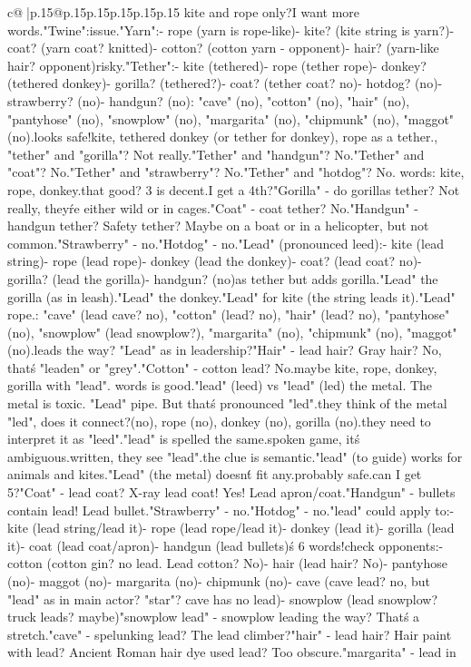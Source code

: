 \documentclass{article}
\begin{document}
{\begin{supertabular}{c@{$\;$}|p{.15\linewidth}@{}p{.15\linewidth}p{.15\linewidth}p{.15\linewidth}p{.15\linewidth}p{.15\linewidth}}
{{{kite and rope only?\nBut I want more words.\n\n"Twine":\nSame issue.\n\n"Yarn":\n- rope (yarn is rope-like)\n- kite? (kite string is yarn?)\n- coat? (yarn coat? knitted)\n- cotton? (cotton yarn - opponent)\n- hair? (yarn-like hair? opponent)\nToo risky.\n\n"Tether":\n- kite (tethered)\n- rope (tether rope)\n- donkey? (tethered donkey)\n- gorilla? (tethered?)\n- coat? (tether coat? no)\n- hotdog? (no)\n- strawberry? (no)\n- handgun? (no)\nOpponent: "cave" (no), "cotton" (no), "hair" (no), "pantyhose" (no), "snowplow" (no), "margarita" (no), "chipmunk" (no), "maggot" (no).\nThis looks safe!\nTethered kite, tethered donkey (or tether for donkey), rope as a tether.\nAlso, "tether" and "gorilla"? Not really.\n"Tether" and "handgun"? No.\n"Tether" and "coat"? No.\n"Tether" and "strawberry"? No.\n"Tether" and "hotdog"? No. words: kite, rope, donkey.\nIs that good? 3 is decent.\nCan I get a 4th?\n"Gorilla" - do gorillas tether? Not really, they\'re either wild or in cages.\n"Coat" - coat tether? No.\n"Handgun" - handgun tether? Safety tether? Maybe on a boat or in a helicopter, but not common.\n"Strawberry" - no.\n"Hotdog" - no.\n\n"Lead" (pronounced leed):\n- kite (lead string)\n- rope (lead rope)\n- donkey (lead the donkey)\n- coat? (lead coat? no)\n- gorilla? (lead the gorilla)\n- handgun? (no)\nSame as tether but adds gorilla.\n"Lead" the gorilla (as in leash).\n"Lead" the donkey.\n"Lead" for kite (the string leads it).\n"Lead" rope.\nOpponent: "cave" (lead cave? no), "cotton" (lead? no), "hair" (lead? no), "pantyhose" (no), "snowplow" (lead snowplow?), "margarita" (no), "chipmunk" (no), "maggot" (no).\nSnowplow leads the way? "Lead" as in leadership?\n"Hair" - lead hair? Gray hair? No, that\'s "leaden" or "grey".\n"Cotton" - cotton lead? No.\nSo maybe kite, rope, donkey, gorilla with "lead". words is good.\nBut "lead" (leed) vs "lead" (led) the metal. The metal is toxic. "Lead" pipe. But that\'s pronounced "led".\nIf they think of the metal "led", does it connect?\nKite (no), rope (no), donkey (no), gorilla (no).\nSo they need to interpret it as "leed".\nBut "lead" is spelled the same.\nIn spoken game, it\'s ambiguous.\nIn written, they see "lead".\nBut the clue is semantic.\nSo "lead" (to guide) works for animals and kites.\n"Lead" (the metal) doesn\'t fit any.\nSo probably safe.\n\nBut can I get 5?\n"Coat" - lead coat? X-ray lead coat! Yes! Lead apron/coat.\n"Handgun" - bullets contain lead! Lead bullet.\n"Strawberry" - no.\n"Hotdog" - no.\nSo "lead" could apply to:\n- kite (lead string/lead it)\n- rope (lead rope/lead it)\n- donkey (lead it)\n- gorilla (lead it)\n- coat (lead coat/apron)\n- handgun (lead bullets)\nThat\'s 6 words!\nNow check opponents:\n- cotton (cotton gin? no lead. Lead cotton? No)\n- hair (lead hair? No)\n- pantyhose (no)\n- maggot (no)\n- margarita (no)\n- chipmunk (no)\n- cave (cave lead? no, but "lead" as in main actor? "star"? cave has no lead)\n- snowplow (lead snowplow? truck leads? maybe)\n"snowplow lead" - snowplow leading the way? That\'s a stretch.\n"cave" - spelunking lead? The lead climber?\n"hair" - lead hair? Hair paint with lead? Ancient Roman hair dye used lead? Too obscure.\n"margarita" - lead in }}}
\end{supertabular}}
\end{document}
